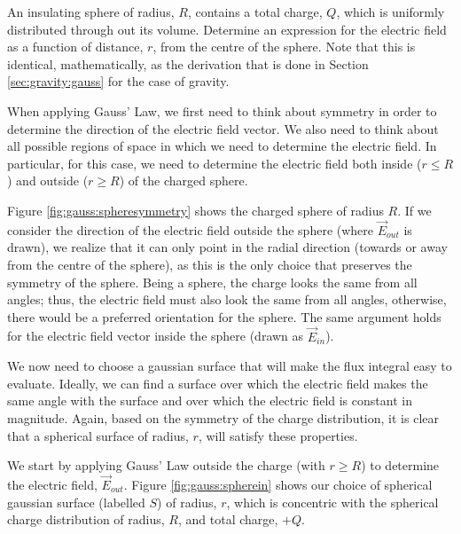 \begin{example}{An insulating sphere of radius, $R$, contains a total charge, $Q$, which is uniformly distributed through out its volume. Determine an expression for the electric field as a function of distance, $r$, from the centre of the sphere.}
Note that this is identical, mathematically, as the derivation that is done in Section \ref{sec:gravity:gauss} for the case of gravity. 

When applying Gauss' Law, we first need to think about symmetry in order to determine the direction of the electric field vector. We also need to think about all possible regions of space in which we need to determine the electric field. In particular, for this case, we need to determine the electric field both inside ($r\leq R$) and outside ($r\geq R$) of the charged sphere.

Figure \ref{fig:gauss:spheresymmetry} shows the charged sphere of radius $R$. If we consider the direction of the electric field outside the sphere (where $\vec E_{out}$ is drawn), we realize that it can only point in the radial direction (towards or away from the centre of the sphere), as this is the only choice that preserves the symmetry of the sphere. Being a sphere, the charge looks the same from all angles; thus, the electric field must also look the same from all angles, otherwise, there would be a preferred orientation for the sphere. The same argument holds for the electric field vector inside the sphere (drawn as $\vec E_{in}$). 

We now need to choose a gaussian surface that will make the flux integral easy to evaluate. Ideally, we can find a surface over which the electric field makes the same angle with the surface and over which the electric field is constant in magnitude. Again, based on the symmetry of the charge distribution, it is clear that a spherical surface of radius, $r$, will satisfy these properties.

We start by applying Gauss' Law outside the charge (with $r\geq R$) to determine the electric field, $\vec E_{out}$. Figure \ref{fig:gauss:spherein} shows our choice of spherical gaussian surface (labelled $S$) of radius, $r$, which is concentric with the spherical charge distribution of radius, $R$, and total charge, $+Q$.


\end{example}
